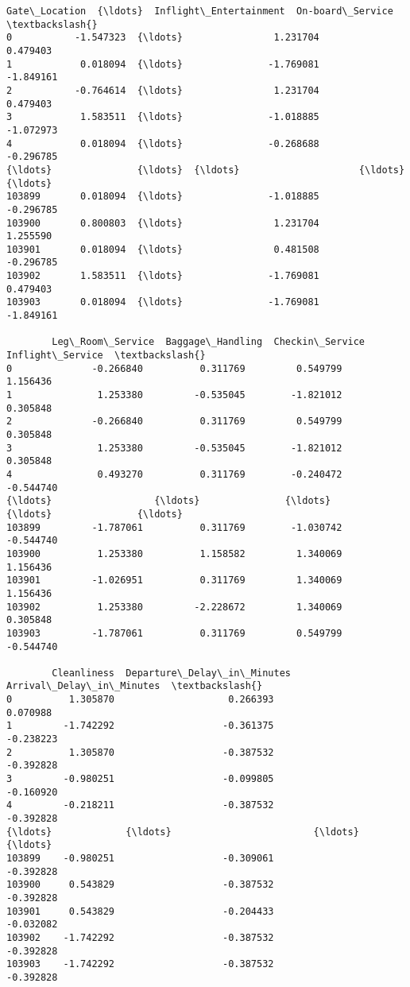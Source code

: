 \documentclass[11pt]{article}
\begin{document}
\begin{tcolorbox}[breakable, size=fbox, boxrule=.5pt, pad at break*=1mm, opacityfill=0]
\begin{Verbatim}[commandchars=\\\{\}]
        Gate\_Location  {\ldots}  Inflight\_Entertainment  On-board\_Service  \textbackslash{}
0           -1.547323  {\ldots}                1.231704          0.479403
1            0.018094  {\ldots}               -1.769081         -1.849161
2           -0.764614  {\ldots}                1.231704          0.479403
3            1.583511  {\ldots}               -1.018885         -1.072973
4            0.018094  {\ldots}               -0.268688         -0.296785
{\ldots}               {\ldots}  {\ldots}                     {\ldots}               {\ldots}
103899       0.018094  {\ldots}               -1.018885         -0.296785
103900       0.800803  {\ldots}                1.231704          1.255590
103901       0.018094  {\ldots}                0.481508         -0.296785
103902       1.583511  {\ldots}               -1.769081          0.479403
103903       0.018094  {\ldots}               -1.769081         -1.849161

        Leg\_Room\_Service  Baggage\_Handling  Checkin\_Service  Inflight\_Service  \textbackslash{}
0              -0.266840          0.311769         0.549799          1.156436
1               1.253380         -0.535045        -1.821012          0.305848
2              -0.266840          0.311769         0.549799          0.305848
3               1.253380         -0.535045        -1.821012          0.305848
4               0.493270          0.311769        -0.240472         -0.544740
{\ldots}                  {\ldots}               {\ldots}              {\ldots}               {\ldots}
103899         -1.787061          0.311769        -1.030742         -0.544740
103900          1.253380          1.158582         1.340069          1.156436
103901         -1.026951          0.311769         1.340069          1.156436
103902          1.253380         -2.228672         1.340069          0.305848
103903         -1.787061          0.311769         0.549799         -0.544740

        Cleanliness  Departure\_Delay\_in\_Minutes  Arrival\_Delay\_in\_Minutes  \textbackslash{}
0          1.305870                    0.266393                  0.070988
1         -1.742292                   -0.361375                 -0.238223
2          1.305870                   -0.387532                 -0.392828
3         -0.980251                   -0.099805                 -0.160920
4         -0.218211                   -0.387532                 -0.392828
{\ldots}             {\ldots}                         {\ldots}                       {\ldots}
103899    -0.980251                   -0.309061                 -0.392828
103900     0.543829                   -0.387532                 -0.392828
103901     0.543829                   -0.204433                 -0.032082
103902    -1.742292                   -0.387532                 -0.392828
103903    -1.742292                   -0.387532                 -0.392828


\end{Verbatim}
\end{tcolorbox}
\end{document}
